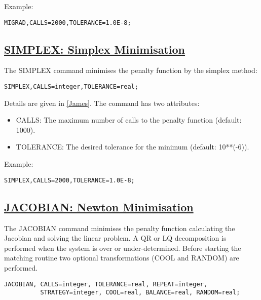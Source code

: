 Example: 
\begin{verbatim}
MIGRAD,CALLS=2000,TOLERANCE=1.0E-8;
\end{verbatim}

\subsection{\href{simplex}{SIMPLEX: Simplex Minimisation}}
\label{subsec:match_simplex}
The SIMPLEX command minimises the penalty function by the simplex method: 

\begin{verbatim}
SIMPLEX,CALLS=integer,TOLERANCE=real;
\end{verbatim}

Details are given in \href{bibliography.html#minuit}{[James]}. The command has two attributes: 
\begin{itemize}
   \item CALLS: The maximum number of calls to the penalty function (default: 1000). 
   \item TOLERANCE: The desired tolerance for the minimum (default: 10**(-6)). 
\end{itemize} 

Example: 
\begin{verbatim}
SIMPLEX,CALLS=2000,TOLERANCE=1.0E-8;
\end{verbatim}

\subsection{\href{jacobian}{JACOBIAN: Newton Minimisation}}
\label{subsec:match_jacobian}
The JACOBIAN command minimises the penalty function calculating the
Jacobian and solving the linear problem. A QR or LQ  decomposition is
performed when the system is over or under-determined. Before starting
the matching routine two optional transformations (COOL and RANDOM) are
performed.      

\begin{verbatim}
JACOBIAN, CALLS=integer, TOLERANCE=real, REPEAT=integer, 
          STRATEGY=integer, COOL=real, BALANCE=real, RANDOM=real;
\end{verbatim}

